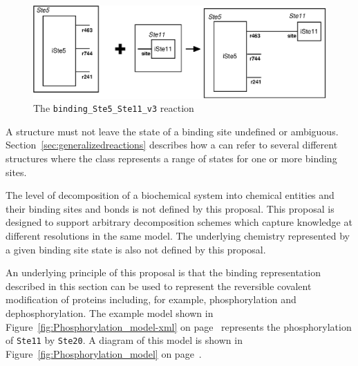 \documentclass{cekarticle}
\begin{document}
\begin{figure}[h]
\begin{example}
\end{example}
  \vspace*{8pt}
  \centering
  \includegraphics[scale = 0.7]{binding_Ste5_Ste11_v3.eps}
  \caption{The \texttt{binding\_Ste5\_Ste11\_v3} reaction}
  \label{fig:binding_Ste5_Ste11_v3}
\end{figure}

A  structure must not leave the state of a binding site undefined or ambiguous.
Section~\ref{sec:generalizedreactions} describes how a  can refer to 
several different  structures where the class represents a range of states for one
or more binding sites.

The level of decomposition of a biochemical system into chemical entities and their binding sites and
bonds is not defined by this proposal.  This proposal is designed to support arbitrary decomposition
schemes which capture knowledge at different resolutions in the same model. The
underlying chemistry represented by a given binding site state is also not defined by this proposal.

An underlying principle of this proposal is that the binding representation described in this section
can be used to represent the reversible covalent modification of proteins including, for example,
phosphorylation and dephosphorylation.  The example model shown in
Figure~\ref{fig:Phosphorylation_model-xml} on page~\pageref{fig:Phosphorylation_model-xml} represents
the phosphorylation of \texttt{Ste11} by \texttt{Ste20}.  A diagram of this model is shown in
Figure~\ref{fig:Phosphorylation_model} on page~\pageref{fig:Phosphorylation_model}.
\end{document}
